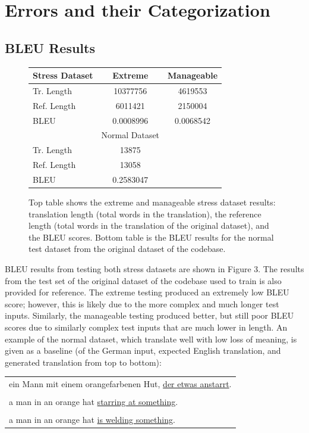 \documentclass[11pt,a4paper]{article}
\begin{document}
\section{Errors and their Categorization}
\subsection{BLEU Results}

\begin{figure}[h]
    \centering
    \begin{tabular}{| l || c | c |}
    \hline
    Stress Dataset & Extreme & Manageable\\
    \hline
    Tr. Length & 10377756 & 4619553\\
    \hline
    Ref. Length & 6011421 & 2150004\\
    \hline
    BLEU & 0.0008996 & 0.0068542\\
    \hline
    \hline
    \hline
    \hline
    & Normal Dataset &\\
    \hline
    Tr. Length & 13875 &\\
    \hline
    Ref. Length & 13058 &\\
    \hline
    BLEU & 0.2583047 &\\
    \hline
    \end{tabular}
    \caption{Top table shows the extreme and manageable stress dataset results: translation length (total words in the translation), the reference length (total words in the translation of the original dataset), and the BLEU scores. Bottom table is the BLEU results for the normal test dataset from the original dataset of the codebase.}
\end{figure}

BLEU results from testing both stress datasets are shown in Figure 3. The results from the test set of the original dataset of the codebase used to train is also provided for reference. The extreme testing produced an extremely low BLEU score; however, this is likely due to the more complex and much longer test inputs. Similarly, the manageable testing produced better, but still poor BLEU scores due to similarly complex test inputs that are much lower in length. An example of the normal dataset, which translate well with low loss of meaning, is given as a baseline (of the German input, expected English translation, and generated translation from top to bottom):

\begin{center}
\begin{tabular}{p{2.5in}}
    \hline
    ein Mann mit einem orangefarbenen Hut, \ul{der etwas anstarrt}.\\
    \\
    a man in an orange hat \ul{starring at something}.\\
    \\
    a man in an orange hat \ul{is welding something}.\\
    \hline
\end{tabular}
\end{center}
\end{document}

